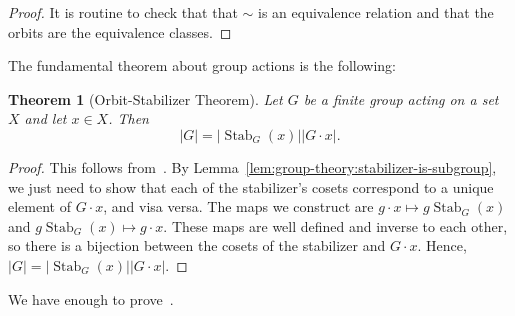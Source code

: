 \documentclass[12pt]{report}
\newcommand{\Stab}{\operatorname{Stab}}
\newtheorem{theorem}{Theorem}[section] %
\theoremstyle{definition}
\begin{document}
\begin{proof}
  It is routine to check that that \(\sim\) is an equivalence relation and that the orbits are the equivalence classes.
\end{proof}

The fundamental theorem about group actions is the following:

\begin{theorem}[Orbit-Stabilizer Theorem]\label{thm:group-theory:orbit-stabilizer}
  Let \(G\) be a finite group acting on a set \(X\) and let \(x \in X\). Then
  \[|G| = |\Stab_{G}(x)| |G \cdot x|.\]
\end{theorem}

\begin{proof}
  This follows from~. By Lemma~\ref{lem:group-theory:stabilizer-is-subgroup}, we just need to show that each of the stabilizer's cosets correspond to a unique element of \(G \cdot x\), and visa versa. The maps we construct are \(g \cdot x \mapsto g\Stab_{G}(x)\) and \(g\Stab_{G}(x) \mapsto g\cdot x\). These maps are well defined and inverse to each other, so there is a bijection between the cosets of the stabilizer and \(G \cdot x\). Hence, \(|G| = |\Stab_{G}(x)| |G \cdot x|\).
\end{proof}

We have enough to prove~.
\end{document}
